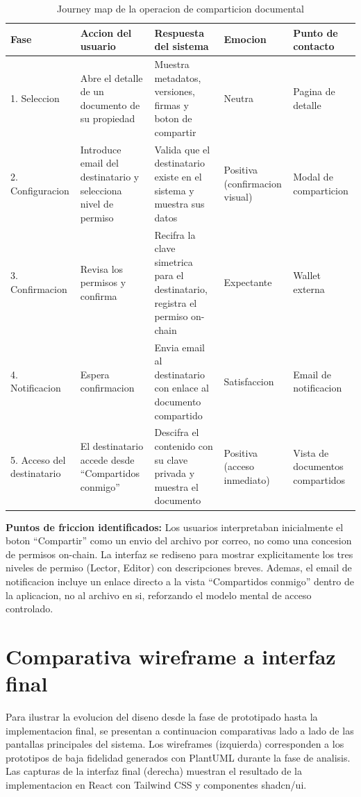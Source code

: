 \documentclass[11pt, a4paper]{article}
\begin{document}
\begin{table}[H]
\centering
\renewcommand{\arraystretch}{1.6}
\small
\begin{tabular}{|p{2.2cm}|p{2.8cm}|p{2.8cm}|p{2.2cm}|p{2.2cm}|}
\hline
\textbf{Fase} & \textbf{Accion del usuario} & \textbf{Respuesta del sistema} & \textbf{Emocion} & \textbf{Punto de contacto} \\
\hline
1. Seleccion & Abre el detalle de un documento de su propiedad & Muestra metadatos, versiones, firmas y boton de compartir & Neutra & Pagina de detalle \\
\hline
2. Configuracion & Introduce email del destinatario y selecciona nivel de permiso & Valida que el destinatario existe en el sistema y muestra sus datos & Positiva (confirmacion visual) & Modal de comparticion \\
\hline
3. Confirmacion & Revisa los permisos y confirma & Recifra la clave simetrica para el destinatario, registra el permiso on-chain & Expectante & Wallet externa \\
\hline
4. Notificacion & Espera confirmacion & Envia email al destinatario con enlace al documento compartido & Satisfaccion & Email de notificacion \\
\hline
5. Acceso del destinatario & El destinatario accede desde ``Compartidos conmigo'' & Descifra el contenido con su clave privada y muestra el documento & Positiva (acceso inmediato) & Vista de documentos compartidos \\
\hline
\end{tabular}
\caption{Journey map de la operacion de comparticion documental}
\label{tab:journey-comparticion}
\end{table}

\textbf{Puntos de friccion identificados:} Los usuarios interpretaban inicialmente el boton ``Compartir'' como un envio del archivo por correo, no como una concesion de permisos on-chain. La interfaz se rediseno para mostrar explicitamente los tres niveles de permiso (Lector, Editor) con descripciones breves. Ademas, el email de notificacion incluye un enlace directo a la vista ``Compartidos conmigo'' dentro de la aplicacion, no al archivo en si, reforzando el modelo mental de acceso controlado.

\section{Comparativa wireframe a interfaz final}

Para ilustrar la evolucion del diseno desde la fase de prototipado hasta la implementacion final, se presentan a continuacion comparativas lado a lado de las pantallas principales del sistema. Los wireframes (izquierda) corresponden a los prototipos de baja fidelidad generados con PlantUML durante la fase de analisis. Las capturas de la interfaz final (derecha) muestran el resultado de la implementacion en React con Tailwind CSS y componentes shadcn/ui.
\end{document}
